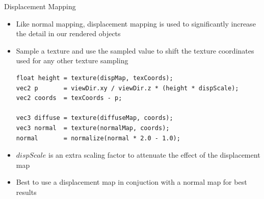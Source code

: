 \documentclass{beamer}
\begin{document}
\begin{frame}[fragile]{Displacement Mapping}
    \begin{itemize}
        \item Like normal mapping, displacement mapping is used to significantly increase the detail in our rendered objects
        \item Sample a texture and use the sampled value to shift the texture coordinates used for any other texture sampling
              \footnotesize{
                  \begin{verbatim}
float height = texture(dispMap, texCoords);
vec2 p       = viewDir.xy / viewDir.z * (height * dispScale);
vec2 coords  = texCoords - p;

vec3 diffuse = texture(diffuseMap, coords);
vec3 normal  = texture(normalMap, coords);
normal       = normalize(normal * 2.0 - 1.0);
\end{verbatim}
              }
        \item $dispScale$ is an extra scaling factor to attenuate the effect of the displacement map
        \item Best to use a displacement map in conjuction with a normal map for best results
    \end{itemize}
\end{frame}
\end{document}
